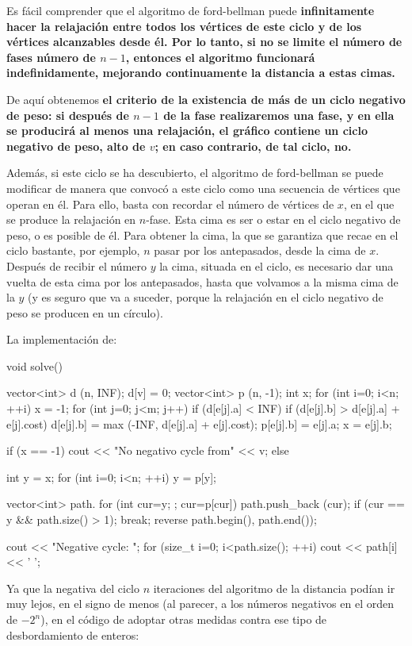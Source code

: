 Es fácil comprender que el algoritmo de ford-bellman puede \bf{infinitamente hacer la relajación} entre todos los vértices de este ciclo y de los vértices alcanzables desde él. Por lo tanto, si no se limite el número de fases número de $n-1$, entonces el algoritmo funcionará indefinidamente, mejorando continuamente la distancia a estas cimas.

De aquí obtenemos \bf{el criterio de la existencia de más de un ciclo negativo de peso}: si después de $n-1$ de la fase realizaremos una fase, y en ella se producirá al menos una relajación, el gráfico contiene un ciclo negativo de peso, alto de $v$; en caso contrario, de tal ciclo, no.

Además, si este ciclo se ha descubierto, el algoritmo de ford-bellman se puede modificar de manera que convocó a este ciclo como una secuencia de vértices que operan en él. Para ello, basta con recordar el número de vértices de $x$, en el que se produce la relajación en $n$-fase. Esta cima es ser o estar en el ciclo negativo de peso, o es posible de él. Para obtener la cima, la que se garantiza que recae en el ciclo bastante, por ejemplo, $n$ pasar por los antepasados, desde la cima de $x$. Después de recibir el número $y$ la cima, situada en el ciclo, es necesario dar una vuelta de esta cima por los antepasados, hasta que volvamos a la misma cima de la $y$ (y es seguro que va a suceder, porque la relajación en el ciclo negativo de peso se producen en un círculo).

La implementación de:

\code
void solve() {
vector<int> d (n, INF);
d[v] = 0;
vector<int> p (n, -1);
int x;
for (int i=0; i<n; ++i) {
x = -1;
for (int j=0; j<m; j++)
if (d[e[j].a] < INF)
if (d[e[j].b] > d[e[j].a] + e[j].cost) {
d[e[j].b] = max (-INF, d[e[j].a] + e[j].cost);
p[e[j].b] = e[j].a;
x = e[j].b;
}
}

if (x == -1)
cout << "No negativo cycle from" << v;
else {
int y = x;
for (int i=0; i<n; ++i)
y = p[y];

vector<int> path.
for (int cur=y; ; cur=p[cur]) {
path.push_back (cur);
if (cur == y && path.size() > 1); break;
}
reverse path.begin(), path.end());

cout << "Negative cycle: ";
for (size_t i=0; i<path.size(); ++i)
cout << path[i] << ' ';
}
}
\endcode

Ya que la negativa del ciclo $n$ iteraciones del algoritmo de la distancia podían ir muy lejos, en el signo de menos (al parecer, a los números negativos en el orden de $-2^n$), en el código de adoptar otras medidas contra ese tipo de desbordamiento de enteros:

